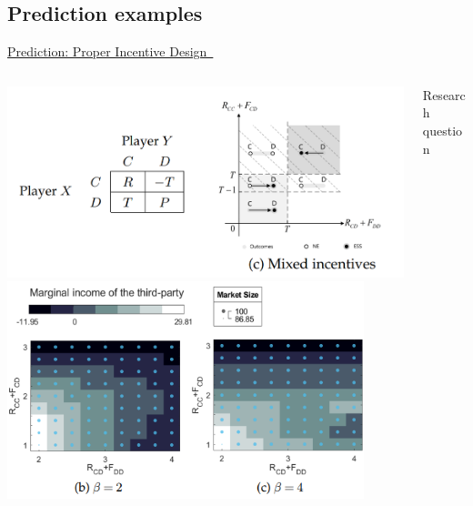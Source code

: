 \documentclass[compress]{beamer}
\begin{document}
\subsection{Prediction examples}
\begin{frame}{\href{https://royalsocietypublishing.org/doi/full/10.1098/rspa.2022.0393}{Prediction: Proper Incentive Design~\cite{zhou2022costly}}}
    \begin{columns}[c]
        \begin{column}{.5\textwidth}
            \centering
            \includegraphics[width=\textwidth]{ProperIncentAnaModel.png}\\[0.5cm]
            \includegraphics[width=0.9\textwidth]{ProperIncentExpResult.png}\\[0.5cm]
        \end{column}
        \begin{column}{.5\textwidth}
            \raggedright
            \begin{minipage}{5.8cm}
                \begin{block}{Research question}

\end{block}
\end{minipage}
\end{column}
\end{columns}
\end{frame}
\end{document}
